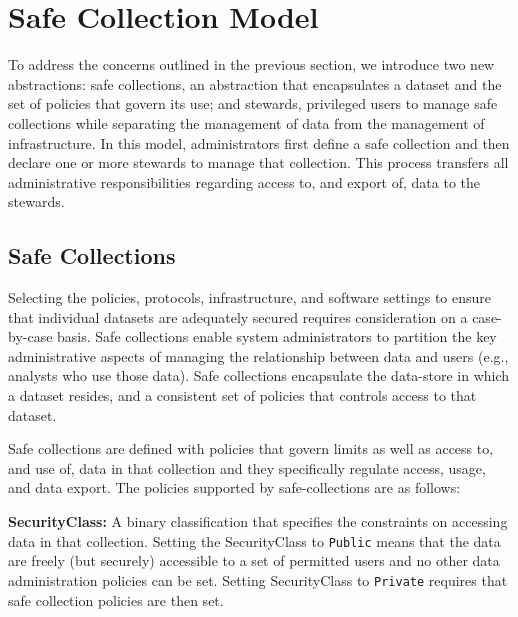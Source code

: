 \section{Safe Collection Model}
\label{sec:architecture}


To address the concerns outlined in the previous section, we introduce two
new abstractions: safe collections, an abstraction that encapsulates
a dataset and the set of policies that govern its use; and stewards, privileged users
to manage safe collections while separating the management of data from the management of infrastructure.
In this model, administrators first define a safe collection and then declare one
or more stewards to manage that collection. This process transfers
all administrative responsibilities regarding access to, and export of, data to the stewards.

\subsection{Safe Collections}

Selecting the policies, protocols, infrastructure, and
software settings to ensure that individual datasets are adequately secured requires consideration
on a case-by-case basis.
Safe collections enable system administrators to partition the key administrative
aspects of managing the relationship between data and users (e.g., analysts who use those data).
Safe collections encapsulate the data-store in which a dataset resides, and a consistent set of policies
that controls access to that dataset.

Safe collections are defined with policies that govern limits as well as access to, and use of,
data in that collection and they specifically regulate access, usage, and data export.
The policies supported by safe-collections are as follows:

\textbf{SecurityClass:} A binary classification that specifies the constraints
on accessing data in that collection. Setting the SecurityClass to \texttt{Public} means that the data are freely
(but securely) accessible to a set of permitted users and no other
data administration policies can be set.  Setting SecurityClass to \texttt{Private}
requires that safe collection policies are then set.

